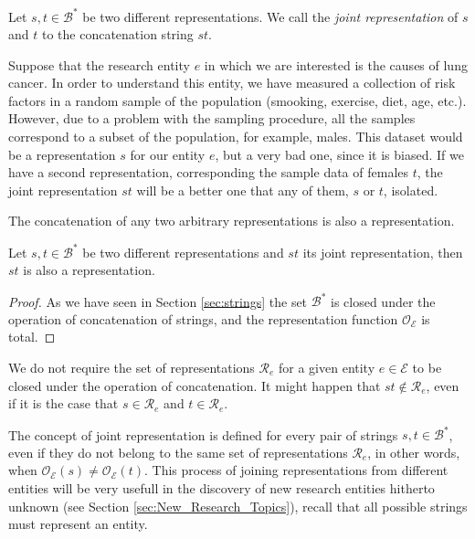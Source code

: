 \begin{definition}
Let $s, t \in \mathcal{B}^\ast$ be two different representations. We call the \emph{joint representation} of $s$ and $t$ to the concatenation string $st$.
\end{definition}

\begin{example}
\label{ex:lung_cancer}
Suppose that the research entity $e$ in which we are interested is the causes of lung cancer. In order to understand this entity, we have measured a collection of risk factors in a random sample of the population (smooking, exercise, diet, age, etc.). However, due to a problem with the sampling procedure, all the samples correspond to a subset of the population, for example, males. This dataset would be a representation $s$ for our entity $e$, but a very bad one, since it is biased. If we have a second representation, corresponding the sample data of females $t$, the joint representation $st$ will be a better one that any of them, $s$ or $t$, isolated.
\end{example}

The concatenation of any two arbitrary representations is also a representation.

\begin{proposition}
Let $s, t \in \mathcal{B}^\ast$ be two different representations and $st$ its joint representation, then $st$ is also a representation.
\end{proposition}
\begin{proof}
As we have seen in Section \ref{sec:strings} the set $\mathcal{B}^\ast$ is closed under the operation of concatenation of strings, and the representation function $\mathcal{O}_\mathcal{E}$ is total.
\end{proof}

We do not require the set of representations $\mathcal{R}_e$ for a given entity $e \in \mathcal{E}$ to be closed under the operation of concatenation. It might happen that $st \notin \mathcal{R}_e$, even if it is the case that $s \in \mathcal{R}_e$ and $t \in \mathcal{R}_e$.

The concept of joint representation is defined for every pair of strings $s, t \in \mathcal{B}^\ast$, even if they do not belong to the same set of representations $\mathcal{R}_e$, in other words, when $\mathcal{O}_\mathcal{E} \left( s \right) \neq \mathcal{O}_\mathcal{E} \left( t \right)$. This process of joining representations from different entities will be very usefull in the discovery of new research entities hitherto unknown (see Section \ref{sec:New_Research_Topics}), recall that all possible strings must represent an entity.

